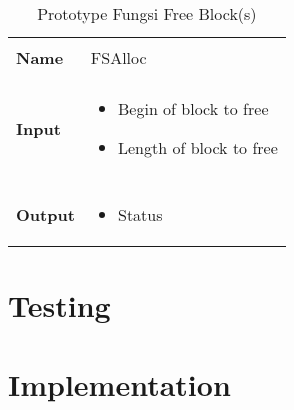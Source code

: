 \documentclass[a4paper, 12pt]{report}
\begin{document}
\begin{table}[h]
  \centering
  \begin{tabular}{p{2cm} p{8cm}}
    \hline\\
    {\bf Name} & FSAlloc\\
    \hline\\
    {\bf Input} & 
    \begin{itemize}[noitemsep,topsep=0pt,parsep=0pt,partopsep=0pt]
    \item Begin of block to free
    \item Length of block to free
    \end{itemize}
    \\
    \hline\\
    {\bf Output} & 
    \begin{itemize}[noitemsep,topsep=0pt,parsep=0pt,partopsep=0pt]
    \item Status
    \end{itemize}
    \\
    \hline
  \end{tabular}
  \caption{Prototype Fungsi Free Block(s)}
  \label{tbl-free}
\end{table}



\chapter{Testing}

\chapter{Implementation}
\end{document}
